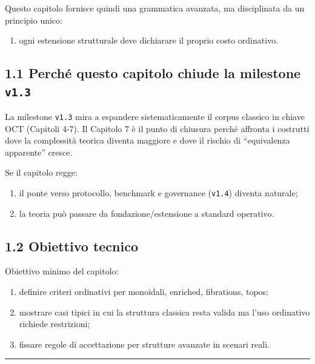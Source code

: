 Questo capitolo fornisce quindi una grammatica avanzata, ma disciplinata da un principio unico:

\begin{enumerate}
\def\labelenumi{\arabic{enumi}.}
\tightlist
\item
  ogni estensione strutturale deve dichiarare il proprio costo ordinativo.
\end{enumerate}

\subsection{\texorpdfstring{1.1 Perché questo capitolo chiude la milestone \texttt{v1.3}}{1.1 Perché questo capitolo chiude la milestone v1.3}}

La milestone \texttt{v1.3} mira a espandere sistematicamente il corpus classico in chiave OCT (Capitoli 4-7). Il Capitolo 7 è il punto di chiusura perché affronta i costrutti dove la complessità teorica diventa maggiore e dove il rischio di ``equivalenza apparente'' cresce.

Se il capitolo regge:

\begin{enumerate}
\def\labelenumi{\arabic{enumi}.}
\tightlist
\item
  il ponte verso protocollo, benchmark e governance (\texttt{v1.4}) diventa naturale;
\item
  la teoria può passare da fondazione/estensione a standard operativo.
\end{enumerate}

\subsection{1.2 Obiettivo tecnico}

Obiettivo minimo del capitolo:

\begin{enumerate}
\def\labelenumi{\arabic{enumi}.}
\tightlist
\item
  definire criteri ordinativi per monoidali, enriched, fibrations, topos;
\item
  mostrare casi tipici in cui la struttura classica resta valida ma l'uso ordinativo richiede restrizioni;
\item
  fissare regole di accettazione per strutture avanzate in scenari reali.
\end{enumerate}

\begin{center}\rule{0.5\linewidth}{0.5pt}\end{center}

